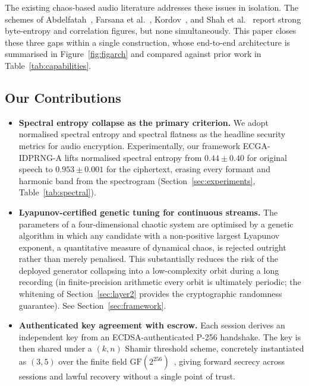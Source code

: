 \documentclass[pdflatex,sn-mathphys-num]{sn-jnl}%
\theoremstyle{thmstyleone}%
\theoremstyle{thmstyletwo}%
\theoremstyle{thmstylethree}%
\begin{document}
The existing chaos-based audio literature addresses these issues in isolation. The schemes of Abdelfatah~\cite{abdelfatah2020}, Farsana et al.~\cite{farsana2021}, Kordov~\cite{kordov2021}, and Shah et al.~\cite{shah2021} report strong byte-entropy and correlation figures, but none simultaneously. This paper closes these three gaps within a single construction, whose end-to-end architecture is summarised in Figure~\ref{fig:figarch} and compared against prior work in Table~\ref{tab:capabilities}.

\subsection{Our Contributions}
\label{sec:contrib}

\begin{itemize}[leftmargin=1.4em]
\item[\textbf{C1}] \textbf{Spectral entropy collapse as the primary criterion.} We adopt normalised spectral entropy and spectral flatness as the headline security metrics for audio encryption. Experimentally, our framework ECGA-IDPRNG-A lifts normalised spectral entropy from $0.44\pm0.40$ for original speech to $0.953\pm0.001$ for the ciphertext, erasing every formant and harmonic band from the spectrogram (Section~\ref{sec:experiments}, Table~\ref{tab:spectral}).

\item[\textbf{C2}] \textbf{Lyapunov-certified genetic tuning for continuous streams.} The parameters of a four-dimensional chaotic system are optimised by a genetic algorithm in which any candidate with a non-positive largest Lyapunov exponent, a quantitative measure of dynamical chaos, is rejected outright rather than merely penalised. This substantially reduces the risk of the deployed generator collapsing into a low-complexity orbit during a long recording (in finite-precision arithmetic every orbit is ultimately periodic; the whitening of Section~\ref{sec:layer2} provides the cryptographic randomness guarantee). See Section~\ref{sec:framework}.

\item[\textbf{C3}] \textbf{Authenticated key agreement with escrow.} Each session derives an independent key from an ECDSA-authenticated P-256 handshake. The key is then shared under a $(k,n)$ Shamir threshold scheme, concretely instantiated as $(3,5)$ over the finite field $\mathrm{GF}(2^{256})$~\cite{shamir1979}, giving forward secrecy across sessions and lawful recovery without a single point of trust.


\end{itemize}
\end{document}

